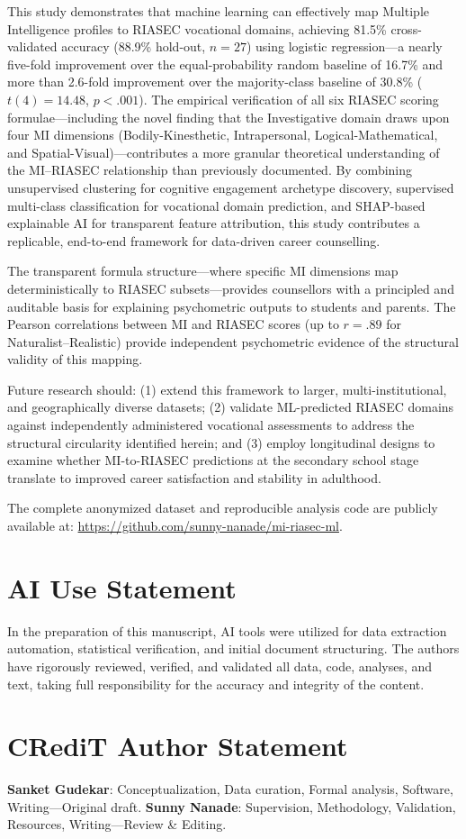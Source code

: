 \documentclass[12pt, a4paper]{article}
\begin{document}
This study demonstrates that machine learning can effectively map Multiple Intelligence profiles to RIASEC vocational domains, achieving 81.5\% cross-validated accuracy (88.9\% hold-out, $n = 27$) using logistic regression---a nearly five-fold improvement over the equal-probability random baseline of 16.7\% and more than 2.6-fold improvement over the majority-class baseline of 30.8\% ($t(4) = 14.48$, $p < .001$). The empirical verification of all six RIASEC scoring formulae---including the novel finding that the Investigative domain draws upon four MI dimensions (Bodily-Kinesthetic, Intrapersonal, Logical-Mathematical, and Spatial-Visual)---contributes a more granular theoretical understanding of the MI--RIASEC relationship than previously documented. By combining unsupervised clustering for cognitive engagement archetype discovery, supervised multi-class classification for vocational domain prediction, and SHAP-based explainable AI for transparent feature attribution, this study contributes a replicable, end-to-end framework for data-driven career counselling.

The transparent formula structure---where specific MI dimensions map deterministically to RIASEC subsets---provides counsellors with a principled and auditable basis for explaining psychometric outputs to students and parents. The Pearson correlations between MI and RIASEC scores (up to $r = .89$ for Naturalist--Realistic) provide independent psychometric evidence of the structural validity of this mapping.

Future research should: (1) extend this framework to larger, multi-institutional, and geographically diverse datasets; (2) validate ML-predicted RIASEC domains against independently administered vocational assessments to address the structural circularity identified herein; and (3) employ longitudinal designs to examine whether MI-to-RIASEC predictions at the secondary school stage translate to improved career satisfaction and stability in adulthood.

The complete anonymized dataset and reproducible analysis code are publicly available at: \url{https://github.com/sunny-nanade/mi-riasec-ml}.

\section{AI Use Statement}

In the preparation of this manuscript, AI tools were utilized for data extraction automation, statistical verification, and initial document structuring. The authors have rigorously reviewed, verified, and validated all data, code, analyses, and text, taking full responsibility for the accuracy and integrity of the content.

\section{CRediT Author Statement}

\textbf{Sanket Gudekar}: Conceptualization, Data curation, Formal analysis, Software, Writing---Original draft. \textbf{Sunny Nanade}: Supervision, Methodology, Validation, Resources, Writing---Review \& Editing.



\end{document}
